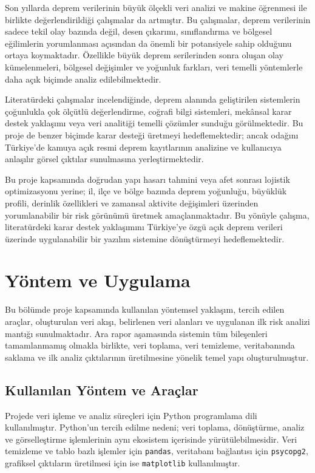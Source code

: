 \documentclass[12pt,a4paper]{report}
\begin{document}
Son yıllarda deprem verilerinin büyük ölçekli veri analizi ve makine öğrenmesi ile
birlikte değerlendirildiği çalışmalar da artmıştır. Bu çalışmalar, deprem verilerinin
sadece tekil olay bazında değil, desen çıkarımı, sınıflandırma ve bölgesel eğilimlerin
yorumlanması açısından da önemli bir potansiyele sahip olduğunu ortaya koymaktadır.
Özellikle büyük deprem serilerinden sonra oluşan olay kümelenmeleri, bölgesel değişimler
ve yoğunluk farkları, veri temelli yöntemlerle daha açık biçimde analiz edilebilmektedir.

Literatürdeki çalışmalar incelendiğinde, deprem alanında geliştirilen sistemlerin
çoğunlukla çok ölçütlü değerlendirme, coğrafi bilgi sistemleri, mekânsal karar destek
yaklaşımı veya veri analitiği temelli çözümler sunduğu görülmektedir. Bu proje de
benzer biçimde karar desteği üretmeyi hedeflemektedir; ancak odağını Türkiye'de kamuya
açık resmi deprem kayıtlarının analizine ve kullanıcıya anlaşılır görsel çıktılar
sunulmasına yerleştirmektedir.

Bu proje kapsamında doğrudan yapı hasarı tahmini veya afet sonrası lojistik optimizasyonu
yerine; il, ilçe ve bölge bazında deprem yoğunluğu, büyüklük profili, derinlik özellikleri
ve zamansal aktivite değişimleri üzerinden yorumlanabilir bir risk görünümü üretmek
amaçlanmaktadır. Bu yönüyle çalışma, literatürdeki karar destek yaklaşımını Türkiye'ye
özgü açık deprem verileri üzerinde uygulanabilir bir yazılım sistemine dönüştürmeyi
hedeflemektedir.

\chapter{Yöntem ve Uygulama}

Bu bölümde proje kapsamında kullanılan yöntemsel yaklaşım, tercih edilen araçlar,
oluşturulan veri akışı, belirlenen veri alanları ve uygulanan ilk risk analizi mantığı
sunulmaktadır. Ara rapor aşamasında sistemin tüm bileşenleri tamamlanmamış olmakla
birlikte, veri toplama, veri temizleme, veritabanında saklama ve ilk analiz çıktılarının
üretilmesine yönelik temel yapı oluşturulmuştur.

\section{Kullanılan Yöntem ve Araçlar}

Projede veri işleme ve analiz süreçleri için Python programlama dili kullanılmıştır.
Python'un tercih edilme nedeni; veri toplama, dönüştürme, analiz ve görselleştirme
işlemlerinin aynı ekosistem içerisinde yürütülebilmesidir. Veri temizleme ve tablo
bazlı işlemler için \texttt{pandas}, veritabanı bağlantısı için \texttt{psycopg2},
grafiksel çıktıların üretilmesi için ise \texttt{matplotlib} kullanılmıştır.
\end{document}
